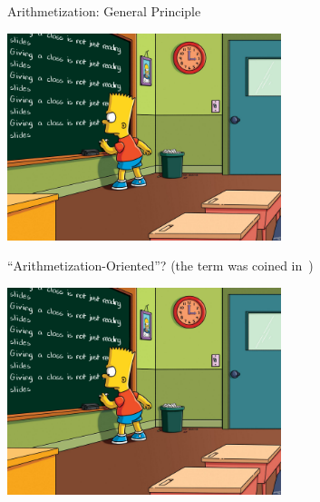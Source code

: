 \documentclass[presentation,aspectratio=1610]{beamer}
\begin{document}
\begin{frame}{Arithmetization: General Principle}
  \begin{center}
    \includegraphics[width=8cm]{./figures/simpsons}
  \end{center}
\end{frame}


\begin{frame}{``Arithmetization-Oriented''?}
  (the term was coined in~\cite{ToSC:AABDS20})
  
  \vfill

  \begin{center}
    \includegraphics[width=8cm]{./figures/simpsons}
  \end{center}
  
  \vfill

\end{frame}
\end{document}
